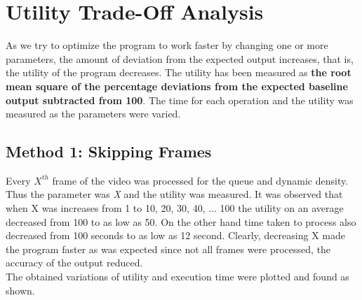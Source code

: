 \documentclass{article} %
\begin{document}
\section{Utility Trade-Off Analysis}
As we try to optimize the program to work faster by changing one or more parameters, the amount of deviation from the expected output increases, that is, the utility of the program decreases. The utility has been measured as \textbf{the root mean square of the percentage deviations from the expected baseline output subtracted from 100}. The time for each operation and the utility was measured as the parameters were varied.

\subsection{Method 1: Skipping Frames}
Every $X^{th}$ frame of the video was processed for the queue and dynamic density. Thus the parameter was \textit{X} and the utility was measured. It was observed that when X was increases from 1 to 10, 20, 30, 40, ... 100 the utility on an average decreased from 100 to as low as 50. On the other hand time taken to process also decreased from 100 seconds to as low as 12 second. Clearly, decreasing X made the program faster as was expected since not all frames were processed, the accuracy of the output reduced.
\\The obtained variations of utility and execution time were plotted and found as shown.
\end{document}

